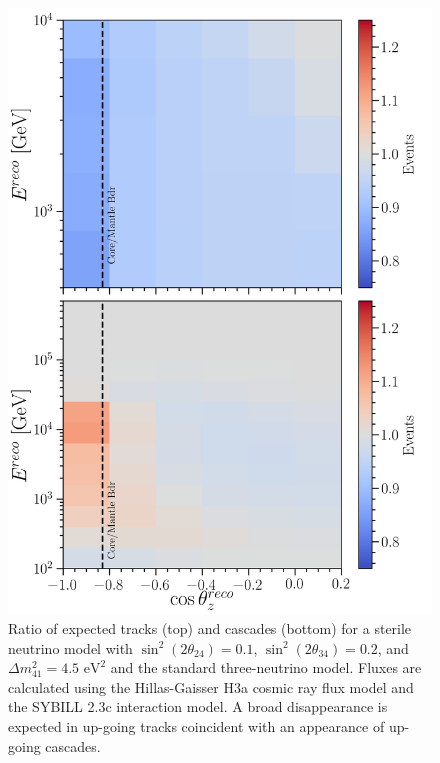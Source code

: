 \documentclass[main.tex]{subfiles}
\begin{document}
\begin{figure}
    \centering
    \includegraphics[width=0.8\linewidth]{figures/event_rate_ratios.png}
    \caption{Ratio of expected tracks (top) and cascades (bottom) for a sterile neutrino model with $\sin^{2}(2\theta_{24})=0.1$, $\sin^{2}(2\theta_{34})=0.2$, and $\Delta m_{41}^{2}=4.5\text{ eV}^{2}$ and the standard three-neutrino model. Fluxes are calculated using the Hillas-Gaisser H3a cosmic ray flux model and the SYBILL 2.3c interaction model. A broad disappearance is expected in up-going tracks coincident with an appearance of up-going cascades.}
    \label{fig:appear}
\end{figure}
\end{document}
